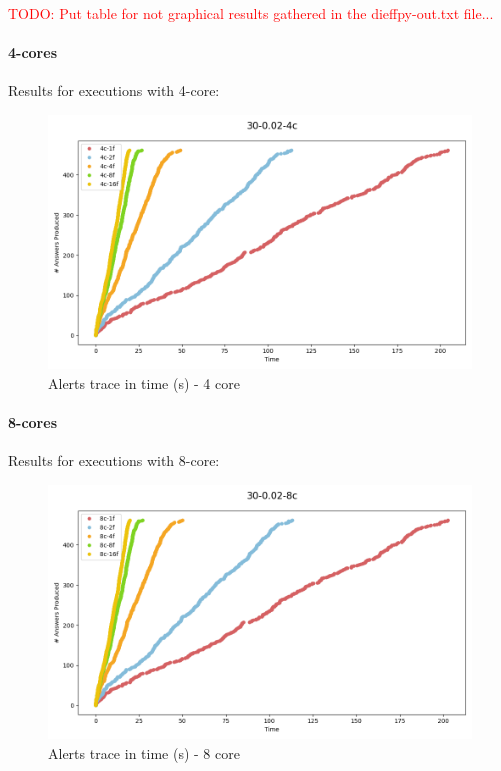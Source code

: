 \textcolor{red}{TODO: Put table for not graphical results gathered in the dieffpy-out.txt file...}

\paragraph{4-cores\\}

Results for executions with 4-core:

\begin{figure}[H]
  \centering
  \includegraphics[scale = 0.5]{images/4-Experiments/E2/30-0.02-4c/traces.png}
  \caption{Alerts trace in time (s) - 4 core}
\end{figure}

\paragraph{8-cores\\}

Results for executions with 8-core:

\begin{figure}[H]
  \centering
  \includegraphics[scale = 0.5]{images/4-Experiments/E2/30-0.02-8c/traces.png}
  \caption{Alerts trace in time (s) - 8 core}
\end{figure}

